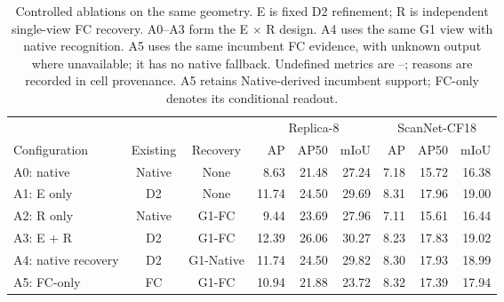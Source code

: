 \begin{table}[!ht]
\centering
\caption{Controlled ablations on the same geometry. E is fixed D2 refinement; R is independent single-view FC recovery. A0--A3 form the E $\times$ R design. A4 uses the same G1 view with native recognition. A5 uses the same incumbent FC evidence, with unknown output where unavailable; it has no native fallback. Undefined metrics are --; reasons are recorded in cell provenance. A5 retains Native-derived incumbent support; FC-only denotes its conditional readout.}
\label{tab:ablation}
\fontsize{9}{10.5}\selectfont
\setlength{\tabcolsep}{4pt}
\begin{tabular*}{\textwidth}{@{\extracolsep{\fill}}lccrrrrrr@{}}
\toprule
& & & \multicolumn{3}{c}{Replica-8} & \multicolumn{3}{c}{ScanNet-CF18} \\
\cmidrule(lr){4-6}\cmidrule(l){7-9}
Configuration & Existing & Recovery & AP & AP50 & mIoU & AP & AP50 & mIoU \\
\midrule
A0: native & Native & None & 8.63 & 21.48 & 27.24 & 7.18 & 15.72 & 16.38 \\
A1: E only & D2 & None & 11.74 & 24.50 & 29.69 & 8.31 & 17.96 & 19.00 \\
A2: R only & Native & G1-FC & 9.44 & 23.69 & 27.96 & 7.11 & 15.61 & 16.44 \\
A3: E + R & D2 & G1-FC & 12.39 & 26.06 & 30.27 & 8.23 & 17.83 & 19.02 \\
\midrule
A4: native recovery & D2 & G1-Native & 11.74 & 24.50 & 29.82 & 8.30 & 17.93 & 18.99 \\
A5: FC-only & FC & G1-FC & 10.94 & 21.88 & 23.72 & 8.32 & 17.39 & 17.94 \\
\bottomrule
\end{tabular*}
\end{table}
